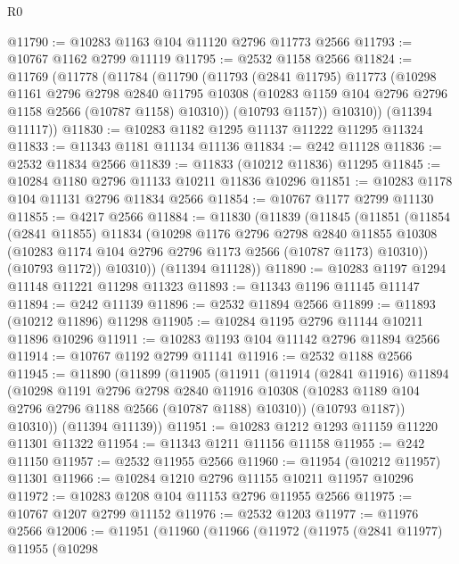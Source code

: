 \begin{lexlean}{R0}
\begin{coremodule}
@11790 := @10283 @1163 @104 @11120 @2796 @11773 @2566
@11793 := @10767 @1162 @2799 @11119
@11795 := @2532 @1158 @2566
@11824 := @11769
    (@11778
      (@11784
        (@11790
          (@11793
            (@2841 @11795)
            @11773
            (@10298
              @1161
              @2796
              @2798
              @2840
              @11795
              @10308
              (@10283 @1159 @104 @2796 @2796 @1158 @2566 (@10787 @1158) @10310))
            (@10793 @1157))
          @10310))
      (@11394 @11117))
@11830 := @10283 @1182 @1295 @11137 @11222 @11295 @11324
@11833 := @11343 @1181 @11134 @11136
@11834 := @242 @11128
@11836 := @2532 @11834 @2566
@11839 := @11833 (@10212 @11836) @11295
@11845 := @10284 @1180 @2796 @11133 @10211 @11836 @10296
@11851 := @10283 @1178 @104 @11131 @2796 @11834 @2566
@11854 := @10767 @1177 @2799 @11130
@11855 := @4217 @2566
@11884 := @11830
    (@11839
      (@11845
        (@11851
          (@11854
            (@2841 @11855)
            @11834
            (@10298
              @1176
              @2796
              @2798
              @2840
              @11855
              @10308
              (@10283 @1174 @104 @2796 @2796 @1173 @2566 (@10787 @1173) @10310))
            (@10793 @1172))
          @10310))
      (@11394 @11128))
@11890 := @10283 @1197 @1294 @11148 @11221 @11298 @11323
@11893 := @11343 @1196 @11145 @11147
@11894 := @242 @11139
@11896 := @2532 @11894 @2566
@11899 := @11893 (@10212 @11896) @11298
@11905 := @10284 @1195 @2796 @11144 @10211 @11896 @10296
@11911 := @10283 @1193 @104 @11142 @2796 @11894 @2566
@11914 := @10767 @1192 @2799 @11141
@11916 := @2532 @1188 @2566
@11945 := @11890
    (@11899
      (@11905
        (@11911
          (@11914
            (@2841 @11916)
            @11894
            (@10298
              @1191
              @2796
              @2798
              @2840
              @11916
              @10308
              (@10283 @1189 @104 @2796 @2796 @1188 @2566 (@10787 @1188) @10310))
            (@10793 @1187))
          @10310))
      (@11394 @11139))
@11951 := @10283 @1212 @1293 @11159 @11220 @11301 @11322
@11954 := @11343 @1211 @11156 @11158
@11955 := @242 @11150
@11957 := @2532 @11955 @2566
@11960 := @11954 (@10212 @11957) @11301
@11966 := @10284 @1210 @2796 @11155 @10211 @11957 @10296
@11972 := @10283 @1208 @104 @11153 @2796 @11955 @2566
@11975 := @10767 @1207 @2799 @11152
@11976 := @2532 @1203
@11977 := @11976 @2566
@12006 := @11951
    (@11960
      (@11966
        (@11972
          (@11975
            (@2841 @11977)
            @11955
            (@10298

\end{coremodule}
\end{lexlean}

